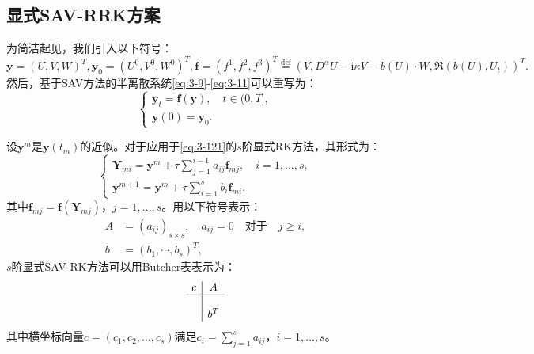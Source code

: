 	\subsection{显式SAV-RRK方案}
	为简洁起见，我们引入以下符号：
	\begin{equation}
	\bm{y}=\left(U,V,W\right)^T,\bm{y}_0=\left(U^0,V^0,W^0\right)^T , \bm{f}=(f^1,f^2,f^3)^T\overset{\text{def}}{=}(V,D^{\alpha} U-\mathrm{i}\kappa V-b(U)\cdot W,\Re\left(b(U), U_t\right))^T.
	\end{equation}
	然后，基于SAV方法的半离散系统\eqref{eq:3-9}-\eqref{eq:3-11}可以重写为：
	\begin{equation}
	\left\{\begin{array}{l}
	\bm{y}_t=\bm{f}(\bm{y}),\quad t \in(0, T],\\
	\bm{y}(0)=\bm{y}_0.
	\end{array}\right.\label{eq:3-121}
	\end{equation}
	
	设$\bm{y}^m$是$\bm{y}\left(t_m\right)$的近似。对于应用于\eqref{eq:3-121}的$s$阶显式RK方法\cite{hairerRungeKuttaMethods2015}，其形式为：
	\begin{equation}
	\left\{\begin{array}{l}
	\bm{Y}_{m i}=\bm{y}^m+\tau \sum\limits_{j=1}^{i-1} a_{i j} \bm{f}_{m j}, \quad i=1, \ldots, s, \\
	\bm{y}^{m+1}=\bm{y}^m+\tau \sum\limits_{i=1}^s b_i \bm{f}_{m i},
	\end{array}\right.\label{eq:4-31}
	\end{equation}
	其中$\bm{f}_{m j}=\bm{f}\left(\bm{Y}_{m j}\right)$，$j=1, \ldots, s$。用以下符号表示：
	\begin{equation}
	\begin{aligned}
	A & =\left(a_{i j}\right)_{s \times s}, \quad a_{i j}=0 \quad \text {对于} \quad j \geq i, \\
	b & =\left(b_1, \cdots, b_s\right)^T,
	\end{aligned}
	\end{equation}
	$s$阶显式SAV-RK方法可以用Butcher表表示为：
	\begin{equation}
	\begin{array}{c|c}
	c & A \\
	\hline \\
	& b^T
	\end{array}
	\end{equation}
	其中横坐标向量$c=(c_1,c_2,\dots,c_s)$满足$c_i=\sum\limits_{j=1}^s a_{i j}$，$i=1, \ldots, s$。

